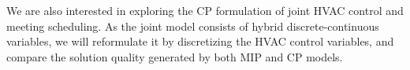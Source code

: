 We are also interested in exploring the CP formulation of joint HVAC control and meeting scheduling. As the joint model consists of hybrid discrete-continuous variables, we will reformulate it by discretizing the HVAC control variables, and compare the solution quality generated by both MIP and CP models. 











